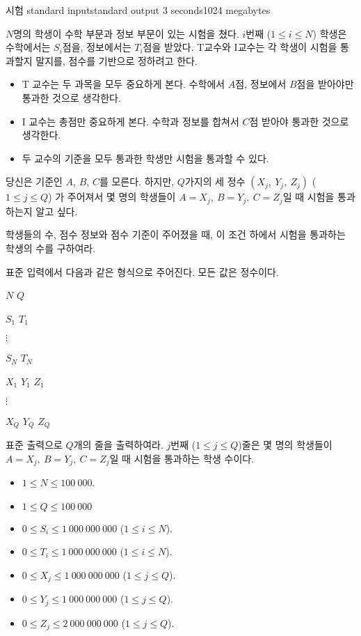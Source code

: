 \begin{problem}{시험}
	{standard input}{standard output}
	{3 seconds}{1024 megabytes}{}
	
	$N$명의 학생이 수학 부문과 정보 부문이 있는 시험을 쳤다. $i$번째 ($1 \le i \le N$) 학생은 수학에서는 $S_i$점을, 정보에서는 $T_i$점을 받았다. T교수와 I교수는 각 학생이 시험을 통과할지 말지를, 점수를 기반으로 정하려고 한다.
	
	\begin{itemize}
		\item T 교수는 두 과목을 모두 중요하게 본다. 수학에서 $A$점, 정보에서 $B$점을 받아야만 통과한 것으로 생각한다.
		\item I 교수는 총점만 중요하게 본다. 수학과 정보를 합쳐서 $C$점 받아야 통과한 것으로 생각한다.
		\item 두 교수의 기준을 모두 통과한 학생만 시험을 통과할 수 있다.
	\end{itemize}

	당신은 기준인 $A$, $B$, $C$를 모른다. 하지만, $Q$가지의 세 정수 $(X_j,\ Y_j,\ Z_j)$ ($1 \le j \le Q$) 가 주어져서 몇 명의 학생들이 $A=X_j,\ B=Y_j,\ C=Z_j$일 때 시험을 통과하는지 알고 싶다.
	
	학생들의 수, 점수 정보와 점수 기준이 주어졌을 때, 이 조건 하에서 시험을 통과하는 학생의 수를 구하여라.

	\InputFile
	
	표준 입력에서 다음과 같은 형식으로 주어진다. 모든 값은 정수이다.

	$N$ $Q$
	
	$S_1$ $T_1$
	
	$\vdots$
	
	$S_N$ $T_N$

	$X_1$ $Y_1$ $Z_1$

	$\vdots$
	
	$X_Q$ $Y_Q$ $Z_Q$

	
	\OutputFile
	
	표준 출력으로 $Q$개의 줄을 출력하여라. $j$번째 ($1 \le j \le Q$)줄은 몇 명의 학생들이 $A=X_j,\ B=Y_j,\ C=Z_j$일 때 시험을 통과하는 학생 수이다.
	
	\Constraints
	
	\begin{itemize}
	
	\item $1 \le N \le 100\ 000$.
	\item $1 \le Q \le 100\ 000$
	\item $0 \le S_i \le 1\ 000\ 000\ 000$ ($1 \le i \le N$).
	\item $0 \le T_i \le 1\ 000\ 000\ 000$ ($1 \le i \le N$).
	\item $0 \le X_j \le 1\ 000\ 000\ 000$ ($1 \le j \le Q$).
	\item $0 \le Y_j \le 1\ 000\ 000\ 000$ ($1 \le j \le Q$).
	\item $0 \le Z_j \le 2\ 000\ 000\ 000$ ($1 \le j \le Q$).
		

\end{itemize}
\end{problem}
